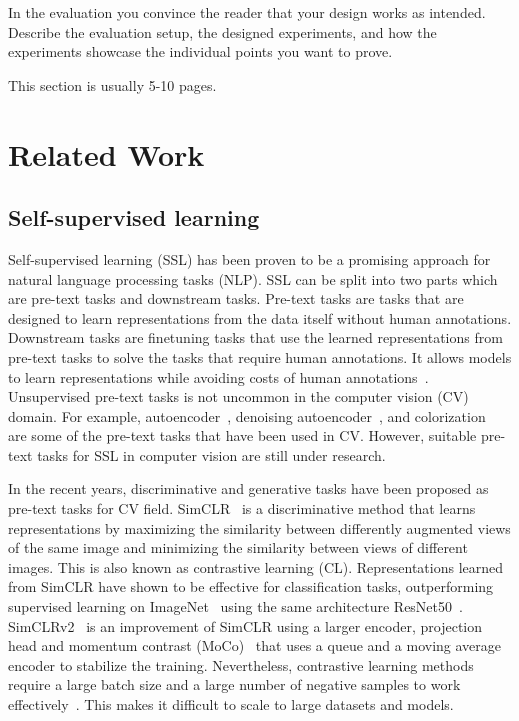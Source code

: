 \documentclass[a4paper,11pt,oneside]{report}
\begin{document}
In the evaluation you convince the reader that your design works as intended.
Describe the evaluation setup, the designed experiments, and how the
experiments showcase the individual points you want to prove.

This section is usually 5-10 pages.


\chapter{Related Work}



\section{Self-supervised learning}
Self-supervised learning (SSL) has been proven to be a promising approach for natural language processing tasks (NLP). SSL can be split into two parts which are pre-text tasks and downstream tasks. Pre-text tasks are tasks that are designed to learn representations from the data itself without human annotations. Downstream tasks are finetuning tasks that use the learned representations from pre-text tasks to solve the tasks that require human annotations. It allows models to learn representations while avoiding costs of human annotations~\cite{Jaiswal2020}. Unsupervised pre-text tasks is not uncommon in the computer vision (CV) domain. For example, autoencoder~\cite{Hinton2006}, denoising autoencoder~\cite{Vincent2008}, and colorization~\cite{Larsson2017} are some of the pre-text tasks that have been used in CV. However, suitable pre-text tasks for SSL in computer vision are still under research.

In the recent years, discriminative and generative tasks have been proposed as pre-text tasks for CV field. SimCLR~\cite{Chen2020Simple} is a discriminative method that learns representations by maximizing the similarity between differently augmented views of the same image and minimizing the similarity between views of different images. This is also known as contrastive learning (CL). Representations learned from SimCLR have shown to be effective for classification tasks, outperforming supervised learning on ImageNet~\cite{Russakovsky2015} using the same architecture ResNet50~\cite{He2016}. SimCLRv2~\cite{Chen2020} is an improvement of SimCLR using a larger encoder, projection head and momentum contrast (MoCo)~\cite{He2020} that uses a queue and a moving average encoder to stabilize the training. Nevertheless, contrastive learning methods require a large batch size and a large number of negative samples to work effectively~\cite{Chen2020Simple}. This makes it difficult to scale to large datasets and models. 
\end{document}

